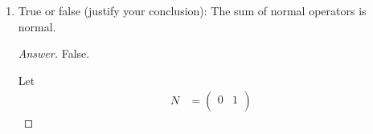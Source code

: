 \documentclass[../psets.tex]{subfiles}
\begin{document}
\begin{enumerate}[label={\textbf{2.\arabic*.}}]
\begin{enumerate}
\begin{proof}[Answer]
\begin{equation*}
\begin{pmatrix}
                    1 & 1\\
                \end{pmatrix}
                \begin{pmatrix}
                    1 & 1\\
                    0 & 1\\
                \end{pmatrix}
                =
                \begin{pmatrix}
                    2 & 1\\
                    1 & 1\\
                \end{pmatrix}
                \neq
                I
            \end{equation*}
            so $A$ is not unitary.
        \end{proof}
        \item If all eigenvalues of a normal operator are 1, then the operator is the identity.
        \begin{proof}[Answer]
            True.\par
            Suppose $N$ is a normal operator with all eigenvalues equal to 1. Then by Theorem 6.2.4, $N=UDU^*$ where $D=I$ (because of the condition on the eigenvalues). It follows that
            \begin{equation*}
                N = UIU^* = UU^* = I
            \end{equation*}
            as desired.
        \end{proof}
        \item A linear operator may preserve norm but not the inner product.
        \begin{proof}[Answer]
            False.\par
            Suppose $U$ is a linear operator that preserves norm. Then $U$ is an isometry. It follows by Theorem 5.6.1 that $U$ preserves the inner product.
        \end{proof}
    \end{enumerate}
    \item True or false (justify your conclusion): The sum of normal operators is normal.
    \begin{proof}[Answer]
        False.\par
        Let
        \begin{align*}
            N &=
            \begin{pmatrix}
                0 & 1\\

\end{pmatrix}
\end{align*}
\end{proof}
\end{enumerate}
\end{document}
